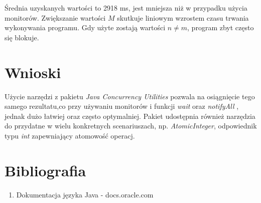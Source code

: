 \documentclass{article}
\begin{document}
Średnia uzyskanych wartości to 2918 ms, jest mniejsza niż w przypadku użycia monitorów.
Zwiększanie wartości $M$ skutkuje liniowym wzrostem czasu trwania wykonywania programu.
Gdy użyte zostają wartości $n \neq m$, program zbyt często się blokuje.

\section{Wnioski}

Użycie narzędzi z pakietu \textit{Java Concurrency Utilities} pozwala na osiągnięcie tego
samego rezultatu,co przy używaniu monitorów i funkcji \textit{wait} oraz \textit{notifyAll}
, jednak dużo łatwiej oraz często optymalniej. Pakiet udostępnia również narzędzia do
przydatne w wielu konkretnych scenariuszach, np. \textit{AtomicInteger}, odpowiednik
typu \textit{int} zapewniający atomowość operacj.

\section{Bibliografia}

\begin{enumerate}
    \item 
    Dokumentacja języka Java - docs.oracle.com
\end{enumerate}
\end{document}
